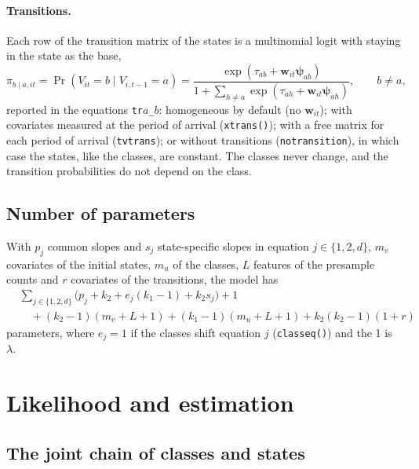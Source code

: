 \documentclass[11pt,a4paper]{article}
\newcommand{\cmd}[1]{\texttt{#1}}
\newcommand{\wv}{\mathbf w}
\begin{document}
\paragraph{Transitions.} Each row of the transition matrix of the states is a multinomial logit with
staying in the state as the base,
\begin{equation}\label{eq:trans}
\pi_{b\mid a,it}=\Pr(V_{it}=b\mid V_{i,t-1}=a)=
\frac{\exp(\tau_{ab}+\wv_{it}\bm\psi_{ab})}{1+\sum_{h\ne a}\exp(\tau_{ah}+\wv_{it}\bm\psi_{ah})},
\qquad b\ne a,
\end{equation}
reported in the equations \cmd{tr}$a$\cmd{\_}$b$: homogeneous by default (no $\wv_{it}$); with covariates
measured at the period of arrival (\cmd{xtrans()}); with a free matrix for each period of arrival
(\cmd{tvtrans}); or without transitions (\cmd{notransition}), in which case the states, like the
classes, are constant. The classes never change, and the transition probabilities do not depend on
the class.

\subsection{Number of parameters}

With $p_j$ common slopes and $s_j$ state-specific slopes in equation $j\in\{1,2,d\}$, $m_v$ covariates
of the initial states, $m_u$ of the classes, $L$ features of the presample counts and $r$ covariates of
the transitions, the model has
\[
\begin{split}
&\sum_{j\in\{1,2,d\}}\big(p_j+k_2+e_j(k_1-1)+k_2s_j\big)+1\\
&\quad+(k_2-1)(m_v+L+1)+(k_1-1)(m_u+L+1)+k_2(k_2-1)(1+r)
\end{split}
\]
parameters, where $e_j=1$ if the classes shift equation $j$ (\cmd{classeq()}) and the 1 is $\lambda$.

\section{Likelihood and estimation}\label{sec:estimation}

\subsection{The joint chain of classes and states}
\end{document}
